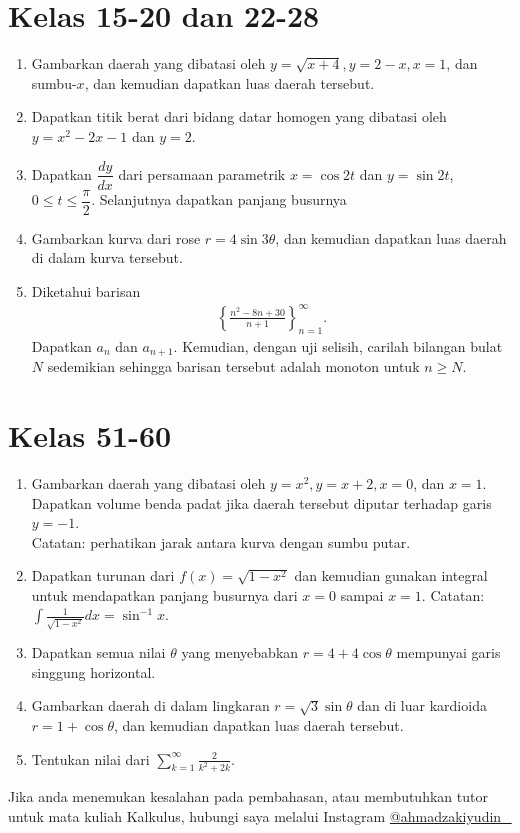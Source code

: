 \documentclass[10pt,openany,a4paper]{article}
\theoremstyle{definition}
\theoremstyle{definition}
\theoremstyle{plain}
\begin{document}
\section*{Kelas 15-20 dan 22-28}
\begin{enumerate}
    \item Gambarkan daerah yang dibatasi oleh $y=\sqrt{x+4}, y=2-x, x=1$, dan sumbu-$x$, dan kemudian dapatkan luas daerah tersebut.
    \item Dapatkan titik berat dari bidang datar homogen yang dibatasi oleh $y=x^2-2x-1$ dan $y=2$.
    \item Dapatkan $\dfrac{dy}{dx}$ dari persamaan parametrik $x=\cos 2t$ dan $y=\sin 2t$, $0\leq t \leq \dfrac{\pi}{2}$. Selanjutnya dapatkan panjang busurnya
    \item Gambarkan kurva dari rose $r=4\sin3\theta$, dan kemudian dapatkan luas daerah di dalam kurva tersebut.
    \item Diketahui barisan 
    \begin{align*}
        \left\{\frac{n^2-8n+30}{n+1}\right\}_{n=1}^{\infty}.
    \end{align*}
    Dapatkan $a_n$ dan $a_{n+1}$. Kemudian, dengan uji selisih, carilah bilangan bulat $N$ sedemikian sehingga barisan tersebut adalah monoton untuk $n\geq N$.
\end{enumerate}
\section*{Kelas 51-60}
\begin{enumerate}
    \item Gambarkan daerah yang dibatasi oleh $y=x^2, y=x+2, x=0$, dan $x=1$. Dapatkan volume benda padat jika daerah tersebut diputar terhadap garis $y=-1$.\\
    Catatan: perhatikan jarak antara kurva dengan sumbu putar.
    \item Dapatkan turunan dari $f(x)=\sqrt{1-x^2}$ dan kemudian gunakan integral untuk mendapatkan panjang busurnya dari $x=0$ sampai $x=1$.
    Catatan: $\displaystyle \int \frac{1}{\sqrt{1-x^2}}dx=\sin^{-1} x $.
    \item Dapatkan semua nilai $\theta$ yang menyebabkan $r=4+4\cos \theta$ mempunyai garis singgung horizontal.
    \item Gambarkan daerah di dalam lingkaran $r=\sqrt{3}\sin\theta$ dan di luar kardioida $r=1+\cos\theta$, dan kemudian dapatkan luas daerah tersebut.
    \item Tentukan nilai dari $\displaystyle \sum_{k=1}^{\infty} \frac{2}{k^2+2k}$.
    \end{enumerate}
\vfill
\vspace{1mm}
\begin{center}
     Jika anda menemukan kesalahan pada pembahasan, 
atau membutuhkan tutor untuk mata kuliah Kalkulus, hubungi saya melalui Instagram \href{https://instagram.com/ahmadzakiyudin_/}{@ahmadzakiyudin\_} 
\end{center}
\newpage
\end{document}
